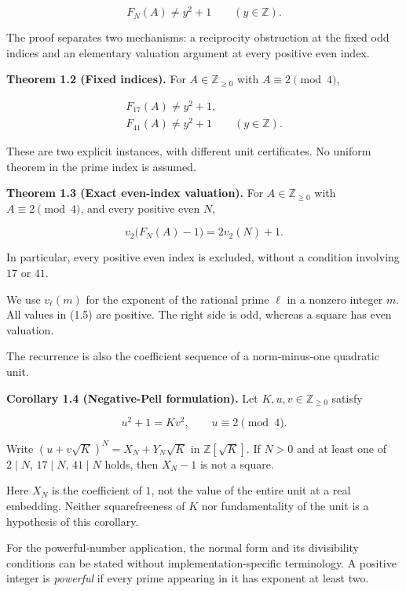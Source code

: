 \documentclass[11pt,a4paper]{article}
\begin{document}
\[
F_N(A)\ne y^2+1
\qquad(y\in\mathbb Z).
\tag{1.3}
\]

The proof separates two mechanisms: a reciprocity obstruction at the
fixed odd indices and an elementary valuation argument at every positive
even index.

\protect{}\label{thm-fixed}
\textbf{Theorem 1.2 (Fixed indices).} For \(A\in\mathbb Z_{\ge0}\) with
\(A\equiv2\pmod4\),

\[
\begin{gathered}
F_{17}(A)\ne y^2+1,\\
F_{41}(A)\ne y^2+1
\qquad(y\in\mathbb Z).
\end{gathered}
\tag{1.4}
\]

These are two explicit instances, with different unit certificates. No
uniform theorem in the prime index is assumed.

\protect{}\label{thm-even}
\textbf{Theorem 1.3 (Exact even-index valuation).} For
\(A\in\mathbb Z_{\ge0}\) with \(A\equiv2\pmod4\), and every positive
even \(N\),

\[
v_2\bigl(F_N(A)-1\bigr)=2v_2(N)+1.
\tag{1.5}
\]

In particular, every positive even index is excluded, without a
condition involving \(17\) or \(41\).

We use \(v_\ell(m)\) for the exponent of the rational prime \(\ell\) in
a nonzero integer \(m\). All values in (1.5) are positive. The right
side is odd, whereas a square has even valuation.

The recurrence is also the coefficient sequence of a norm-minus-one
quadratic unit.

\protect{}\label{cor-pell}
\textbf{Corollary 1.4 (Negative-Pell formulation).} Let
\(K,u,v\in\mathbb Z_{\ge0}\) satisfy

\[
u^2+1=Kv^2,\qquad u\equiv2\pmod4.
\tag{1.6}
\]

Write \((u+v\sqrt K)^N=X_N+Y_N\sqrt K\) in \(\mathbb Z[\sqrt K]\). If
\(N>0\) and at least one of \(2\mid N\), \(17\mid N\), \(41\mid N\)
holds, then \(X_N-1\) is not a square.

Here \(X_N\) is the coefficient of \(1\), not the value of the entire
unit at a real embedding. Neither squarefreeness of \(K\) nor
fundamentality of the unit is a hypothesis of this corollary.

For the powerful-number application, the normal form and its
divisibility conditions can be stated without implementation-specific
terminology. A positive integer is \emph{powerful} if every prime
appearing in it has exponent at least two.
\end{document}
